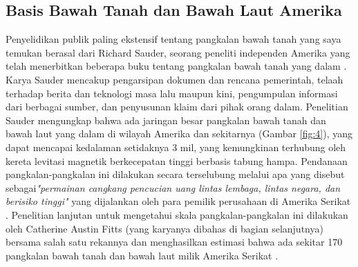 \documentclass[10pt,twocolumn,letterpaper]{article}
\begin{document}
\subsection{Basis Bawah Tanah dan Bawah Laut Amerika}

Penyelidikan publik paling ekstensif tentang pangkalan bawah tanah yang saya temukan berasal dari Richard Sauder, seorang peneliti independen Amerika yang telah menerbitkan beberapa buku tentang pangkalan bawah tanah yang dalam \cite{22}. Karya Sauder mencakup pengarsipan dokumen dan rencana pemerintah, telaah terhadap berita dan teknologi masa lalu maupun kini, pengumpulan informasi dari berbagai sumber, dan penyusunan klaim dari pihak orang dalam. Penelitian Sauder mengungkap bahwa ada jaringan besar pangkalan bawah tanah dan bawah laut yang dalam di wilayah Amerika dan sekitarnya (Gambar \ref{fig:4}), yang dapat mencapai kedalaman setidaknya 3 mil, yang kemungkinan terhubung oleh kereta levitasi magnetik berkecepatan tinggi berbasis tabung hampa. Pendanaan pangkalan-pangkalan ini dilakukan secara terselubung melalui apa yang disebut sebagai\textit{"permainan cangkang pencucian uang lintas lembaga, lintas negara, dan berisiko tinggi"} yang dijalankan oleh para pemilik perusahaan di Amerika Serikat \cite{22}. Penelitian lanjutan untuk mengetahui skala pangkalan-pangkalan ini dilakukan oleh Catherine Austin Fitts (yang karyanya dibahas di bagian selanjutnya) bersama salah satu rekannya dan menghasilkan estimasi bahwa ada sekitar 170 pangkalan bawah tanah dan bawah laut milik Amerika Serikat \cite{16,20}.
\end{document}
